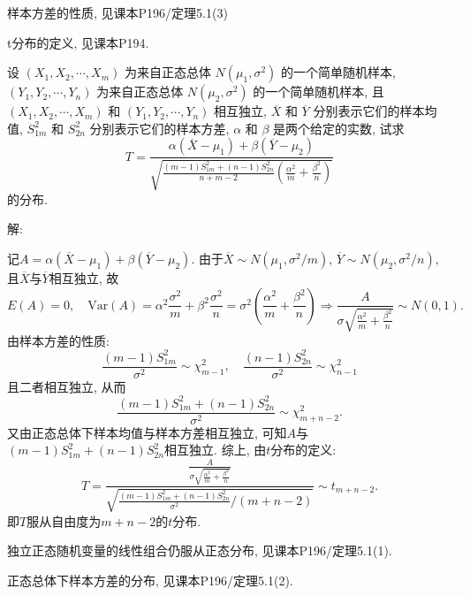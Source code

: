 \documentclass[standard]{ExBook}
\renewenvironment{shaded}{%
  \def\FrameCommand{\fboxsep=\FrameSep \colorbox{shadecolor}}%
  \MakeFramed{\advance\hsize-\width \FrameRestore}%
}{%
  \endMakeFramed
}
\begin{document}
\begin{qitems}
\textcolor{themeColor}{\selectfont {} 样本方差的性质, 见课本P196/定理5.1(3)}

\textcolor{themeColor}{\selectfont {} t分布的定义, 见课本P194.}

\vspace{2.5cm-5em}

    \begin{bbox}
    \begin{shaded}
        \qitem
设 \( (X_1, X_2, \cdots, X_m) \) 为来自正态总体 \( N(\mu_1, \sigma^2) \) 的一个简单随机样本, \( (Y_1, Y_2, \cdots, Y_n) \) 为来自正态总体 \( N(\mu_2, \sigma^2) \) 的一个简单随机样本, 且 \( (X_1, X_2, \cdots, X_m) \) 和 \( (Y_1, Y_2, \cdots, Y_n) \) 相互独立, \( \overline{X} \) 和 \( \overline{Y} \) 分别表示它们的样本均值, \( S_{1m}^2 \) 和 \( S_{2n}^2 \) 分别表示它们的样本方差, \( \alpha \) 和 \( \beta \) 是两个给定的实数, 试求
\[T = \displaystyle\frac{\alpha (\overline{X} - \mu_1) + \beta (\overline{Y} - \mu_2)}{\sqrt{\displaystyle\frac{(m-1)S_{1m}^2 + (n-1)S_{2n}^2}{n+m-2} \left( \frac{\alpha^2}{m} + \frac{\beta^2}{n} \right)}}\]
的分布.
    \end{shaded}
    \end{bbox}

\vspace{\dimexpr2.5cm-5em\relax}

解:

记$A=\alpha(\overline{X}-\mu_1)+\beta(\overline{Y}-\mu_2)$. 由于$\overline{X}\sim N(\mu_1,\sigma^2/m)$, $\overline{Y}\sim N(\mu_2,\sigma^2/n)$, 且$\overline{X}$与$\overline{Y}$相互独立, 故
$$
E(A)=0,\quad
\mathrm{Var}(A)=\alpha^2\frac{\sigma^2}{m}+\beta^2\frac{\sigma^2}{n}
=\sigma^2\left(\frac{\alpha^2}{m}+\frac{\beta^2}{n}\right)
\Longrightarrow
\frac{A}{\sigma\sqrt{\frac{\alpha^2}{m}+\frac{\beta^2}{n}}}\sim N(0,1).
$$
由样本方差的性质:
$$
\frac{(m-1)S_{1m}^2}{\sigma^2}\sim\chi^2_{m-1},
\quad
\frac{(n-1)S_{2n}^2}{\sigma^2}\sim\chi^2_{n-1}
$$
且二者相互独立, 从而
$$
\frac{(m-1)S_{1m}^2+(n-1)S_{2n}^2}{\sigma^2}\sim\chi^2_{m+n-2}.
$$
又由正态总体下样本均值与样本方差相互独立, 可知$A$与$(m-1)S_{1m}^2+(n-1)S_{2n}^2$相互独立. 综上, 由$t$分布的定义:
$$
T
=
\frac{\frac{A}{\sigma\sqrt{\frac{\alpha^2}{m}+\frac{\beta^2}{n}}}}
{\sqrt{\frac{(m-1)S_{1m}^2+(n-1)S_{2n}^2}{\sigma^2}\big/(m+n-2)}}
\sim t_{m+n-2}.
$$
即$T$服从自由度为$m+n-2$的$t$分布.

\textcolor{themeColor}{\selectfont {} 独立正态随机变量的线性组合仍服从正态分布, 见课本P196/定理5.1(1).}

\textcolor{themeColor}{\selectfont {} 正态总体下样本方差的分布, 见课本P196/定理5.1(2).}


\end{qitems}
\end{document}
